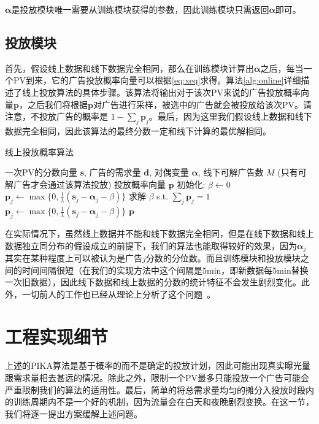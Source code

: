 $\bm{\alpha}$是投放模块唯一需要从训练模块获得的参数，因此训练模块只需返回$\bm{\alpha}$即可。

\subsection{投放模块}

首先，假设线上数据和线下数据完全相同，那么在训练模块计算出$\bm{\alpha}$之后，每当一个PV到来，它的广告投放概率向量可以根据\eqref{eq:xeq}求得。算法\ref{alg:online}详细描述了线上投放算法的具体步骤。该算法将输出对于该次PV来说的广告投放概率向量$\bm{p}$，之后我们将根据$\bm{p}$对广告进行采样，被选中的广告就会被投放给该次PV。请注意，不投放广告的概率是 $1-\sum_j \bm{p}_j$。最后，因为这里我们假设线上数据和线下数据完全相同，因此该算法的最终分数一定和线下计算的最优解相同。

\begin{algorithm}[tb]
	\caption{线上投放概率算法} 
	\label{alg:online}
	\begin{algorithmic}[1]
		\REQUIRE 一次PV的分数向量 $\bm{s}$, 广告的需求量 $\bm{d}$, 对偶变量 $\bm{\alpha}$, 线下可解广告数 $M$  (只有可解广告才会通过该算法投放)
		\ENSURE 投放概率向量 $\bm{p}$
		\STATE 初始化: $\beta \leftarrow 0$
		\STATE $\bm{p}_j \leftarrow \max \{0, \frac{1}{\lambda}  (\bm{s}_j - \bm{\alpha}_j - \beta )\}$
		\ENDFOR
		\STATE 求解 $\beta$ s.t. $\sum_j \bm{p}_j = 1$
		\STATE $\bm{p}_j \leftarrow \max \{0, \frac{1}{\lambda}  (\bm{s}_j - \bm{\alpha}_j - \beta )\}$
		\ENDFOR
		\ENDIF
		\RETURN $\bm{p}$
	\end{algorithmic}
\end{algorithm}

在实际情况下，虽然线上数据并不能和线下数据完全相同，但是在线下数据和线上数据独立同分布的假设成立的前提下，我们的算法也能取得较好的效果，因为$\bm{\alpha}_j$其实在某种程度上可以被认为是广告$j$分数的分位数。而且训练模块和投放模块之间的时间间隔很短（在我们的实现方法中这个间隔是5min，即新数据每5min替换一次旧数据），因此线下数据和线上数据的分数的统计特征不会发生剧烈变化。此外，一切前人的工作也已经从理论上分析了这个问题~\cite{devanur2009adwords, feldman2010online}。

\section{工程实现细节}

上述的PIKA算法是基于概率的而不是确定的投放计划，因此可能出现真实曝光量跟需求量相去甚远的情况。除此之外，限制一个PV最多只能投放一个广告可能会严重限制我们的算法的适用性。最后，简单的将总需求量均匀的摊分入投放时段内的训练周期内不是一个好的机制，因为流量会在白天和夜晚剧烈变换。在这一节，我们将逐一提出方案缓解上述问题。

